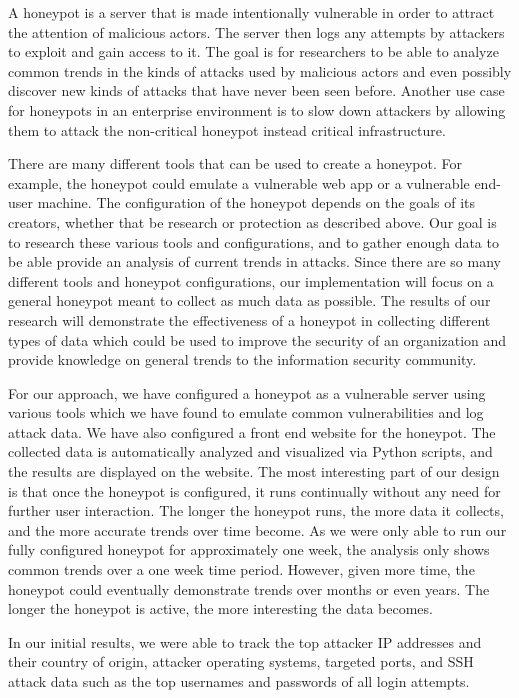 A honeypot is a server that is made intentionally vulnerable in order to attract the attention of malicious actors. The server then logs any attempts by attackers to exploit and gain access to it. The goal is for researchers to be able to analyze common trends in the kinds of attacks used by malicious actors and even possibly discover new kinds of attacks that have never been seen before. Another use case for honeypots in an enterprise environment is to slow down attackers by allowing them to attack the non-critical honeypot instead critical infrastructure. 

There are many different tools that can be used to create a honeypot. For example, the honeypot could emulate a vulnerable web app or a vulnerable end-user machine. The configuration of the honeypot depends on the goals of its creators, whether that be research or protection as described above. Our goal is to research these various tools and configurations, and to gather enough data to be able provide an analysis of current trends in attacks. Since there are so many different tools and honeypot configurations, our implementation will focus on a general honeypot meant to collect as much data as possible. The results of our research will demonstrate the effectiveness of a honeypot in collecting different types of data which could be used to improve the security of an organization and provide knowledge on general trends to the information security community. 

For our approach, we have configured a honeypot as a vulnerable server using various tools which we have found to emulate common vulnerabilities and log attack data. We have also configured a front end website for the honeypot. The collected data is automatically analyzed and visualized via Python scripts, and the results are displayed on the website. The most interesting part of our design is that once the honeypot is configured, it runs continually without any need for further user interaction. The longer the honeypot runs, the more data it collects, and the more accurate trends over time become. As we were only able to run our fully configured honeypot for approximately one week, the analysis only shows common trends over a one week time period. However, given more time, the honeypot could eventually demonstrate trends over months or even years. The longer the honeypot is active, the more interesting the data becomes. 

In our initial results, we were able to track the top attacker IP addresses and their country of origin, attacker operating systems, targeted ports, and SSH attack data such as the top usernames and passwords of all login attempts. 